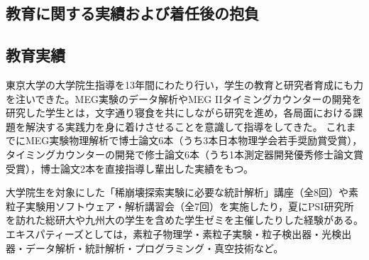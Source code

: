 
\subsection{教育に関する実績および着任後の抱負}

\noindent
\vspace{-2zw}

\subsection{教育実績}
東京大学の大学院生指導を13年間にわたり行い，学生の教育と研究者育成にも力を注いできた。MEG実験のデータ解析やMEG IIタイミングカウンターの開発を研究した学生とは，文字通り寝食を共にしながら研究を進め，各局面における課題を解決する実践力を身に着けさせることを意識して指導をしてきた。%
これまでにMEG実験物理解析で博士論文6本（うち3本日本物理学会若手奨励賞受賞），タイミングカウンターの開発で修士論文6本（うち1本測定器開発優秀修士論文賞受賞），博士論文2本を直接指導し輩出した実績をもつ。

大学院生を対象にした「稀崩壊探索実験に必要な統計解析」講座（全8回）や素粒子実験用ソフトウェア・解析講習会（全7回）を実施したり，夏にPSI研究所を訪れた総研大や九州大の学生を含めた学生ゼミを主催したりした経験がある。エキスパティーズとしては，素粒子物理学・素粒子実験・粒子検出器・光検出器・データ解析・統計解析・プログラミング・真空技術など。

\newpage